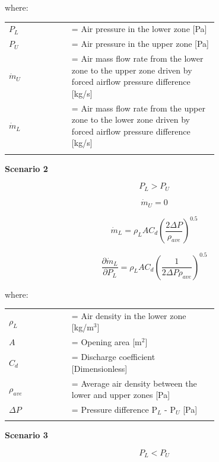 where:

\begin{tabular}{lp{0.7\linewidth}}
\\
$P_L$ &= Air pressure in the lower zone [Pa] \\
$P_U$ &= Air pressure in the upper zone [Pa] \\
$\dot{m}_U$ &= Air mass flow rate from the lower zone to the upper zone driven by forced airflow pressure difference [kg/s]\\
$\dot{m}_L$ &= Air mass flow rate from the upper zone to the lower zone driven by forced airflow pressure difference [kg/s]\\
\\
\end{tabular}

\textbf{Scenario 2}

\begin{equation}
P_L > P_U
\end{equation}

\begin{equation}
\dot{m}_U = 0
\end{equation}

\begin{equation}
\dot{m}_L = \rho_L A C_d \left( {\frac{2\Delta P}{\rho_{ave}}} \right)^{0.5}
\end{equation}

\begin{equation}
\frac{\partial \dot{m}_L}{\partial {P_L}} = \rho_L A C_d \left( \frac{1}{2\Delta P \rho_{ave}} \right)^{0.5}
\end{equation}

where:

\begin{tabular}{lp{0.7\linewidth}}
\\
$\rho_L$ &= Air density in the lower zone [kg/m\(^{3}\)]\\
$A$ &= Opening area [m\(^{2}\)] \\
$C_d$ &= Discharge coefficient [Dimensionless]\\
$\rho_{ave}$ &= Average air density between the lower and upper zones [Pa] \\
$\Delta P$ &= Pressure difference P\(_{L}\) - P\(_{U}\) [Pa]\\
\\
\end{tabular}

\textbf{Scenario 3}

\begin{equation}
P_L < P_U
\end{equation}

